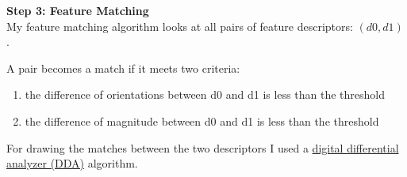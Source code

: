 \documentclass[12pt]{article}
\begin{document}
\textbf{Step 3: Feature Matching}\\

My feature matching algorithm looks at all pairs of feature descriptors: $(d0,d1)$.

A pair becomes a match if it meets two criteria:
\begin{enumerate}
    \item the difference of orientations between d0 and d1 is less than the threshold
    \item the difference of magnitude between d0 and d1 is less than the threshold
\end{enumerate}

For drawing the matches between the two descriptors I used a 
\href{https://en.wikipedia.org/wiki/Digital_differential_analyzer_(graphics_algorithm)}{digital differential analyzer (DDA)} 
algorithm.
\end{document}
